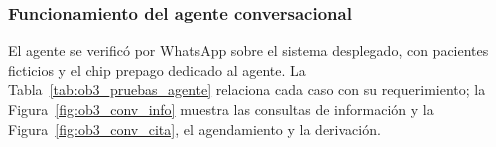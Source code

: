 
\subsubsection{Funcionamiento del agente conversacional}

El agente se verificó por WhatsApp sobre el sistema desplegado, con pacientes ficticios y el chip prepago dedicado al agente. La Tabla~\ref{tab:ob3_pruebas_agente} relaciona cada caso con su requerimiento; la Figura~\ref{fig:ob3_conv_info} muestra las consultas de información y la Figura~\ref{fig:ob3_conv_cita}, el agendamiento y la derivación.


